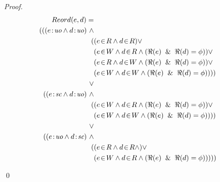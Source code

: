 \begin{proof}
    \begin{align*}
        Reord(e,d) = \\
        (
        ((\et{e}{uo} \wedge \et{d}{uo}) \ \wedge \\ 
            \quad ( 
                    &(\event{e}{R} \wedge \event{d}{R}) \vee \\ 
                    &(\event{e}{W} \wedge \event{d}{R} \wedge (\Re(e) \And \Re(d) = \phi)) \vee \\
                    &(\event{e}{R} \wedge \event{d}{W} \wedge (\Re(e) \And \Re(d) = \phi)) \vee \\
                    &(\event{e}{W} \wedge \event{d}{W} \wedge (\Re(e) \And \Re(d) = \phi)) 
                )
        ) \\ \vee \\
        ((\et{e}{sc} \wedge \et{d}{uo}) \ \wedge \\
            \quad (
                    & (\event{e}{W} \wedge \event{d}{R} \wedge (\Re(e) \And \Re(d) = \phi)) \vee \\
                    & (\event{e}{W} \wedge \event{d}{W} \wedge (\Re(e) \And \Re(d) = \phi)) 
                )
        ) \\ \vee \\
        ((\et{e}{uo} \wedge \et{d}{sc}) \ \wedge \\
            \quad (
                    & (\event{e}{R} \wedge \event{d}{R} \wedge) \vee \\
                    & (\event{e}{W} \wedge \event{d}{R} \wedge (\Re(e) \And \Re(d) = \phi)) 
                )
        )
        )
    \end{align*}
        
        \qed  
\end{proof}